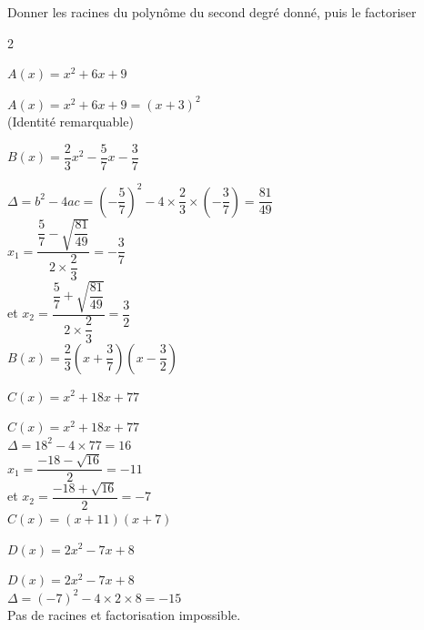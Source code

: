\documentclass[12pt,a4paper]{article}  %
\begin{document}
\vspace{-0.3cm}

Donner les racines du polynôme du second degré donné, puis le factoriser
\begin{multicols}{2}
\begin{enumMet}
    \item $A(x)=x^{2}+6 x+9$ 
    \begin{corrBox}
    	$A(x)=x^{2}+6 x+9=(x+3)^2$\\
    	(Identité remarquable)
    \end{corrBox}
    \item $B(x)=\dfrac{2}{3}x^{2}-\dfrac{5}{7} x-\dfrac{3}{7}$ 
    \begin{corrBox}
    	$\Delta=b^2-4ac=(-\dfrac{5}{7})^2-4\times\dfrac{2}{3}\times(-\dfrac{3}{7})=\dfrac{81}{49}$\\
    	$x_1=\dfrac{\dfrac{5}{7}-\sqrt{\dfrac{81}{49}}}{2\times\dfrac{2}{3}}=-\dfrac{3}{7}$\\
    	et $x_2=\dfrac{\dfrac{5}{7}+\sqrt{\dfrac{81}{49}}}{2\times\dfrac{2}{3}}=\dfrac{3}{2}$\\
    	$B(x)=\dfrac{2}{3}(x+\dfrac{3}{7})(x-\dfrac{3}{2})$
    \end{corrBox}
	\columnbreak
    \item $C(x)=x^{2}+18 x+77$ 
    \begin{corrBox}
    	$C(x)=x^{2}+18 x+77$\\
    	$\Delta=18^2-4\times77=16$\\
    	$x_1=\dfrac{-18-\sqrt{16}}{2}=-11$\\
    	et $x_2=\dfrac{-18+\sqrt{16}}{2}=-7$\\
    	$C(x)=(x+11)(x+7)$
    \end{corrBox}
    \item $D(x)=2 x^{2}-7 x+8$ 
    \begin{corrBox}
    	$D(x)=2 x^{2}-7 x+8$\\
    	$\Delta=(-7)^2-4\times2\times8=-15$\\
    	Pas de racines et factorisation impossible.
    \end{corrBox}
\end{enumMet}
\end{multicols}

\vspace{-0.3cm}
\end{document}
